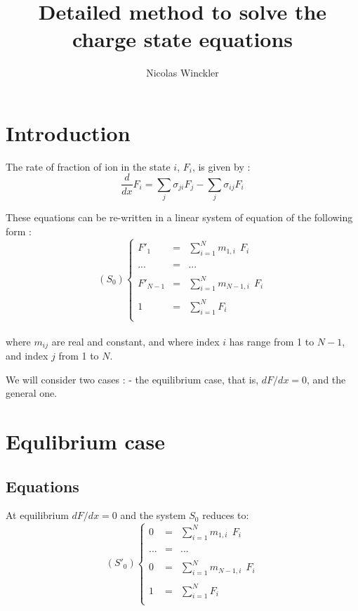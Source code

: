 \documentclass[a4paper,12pt]{article}
\title{Detailed method to solve the charge state equations}
\author{Nicolas Winckler}
\begin{document}
\maketitle


\section{Introduction}

The rate of fraction of ion in the state $i$, $F_i$, is given by :
\begin{equation}
\frac{d}{dx}F_i = \sum_j \sigma_{ji} F_j - \sum_j \sigma_{ij} F_i
\end{equation}


These equations can be re-written in a linear system of equation of the following form :
\\ 

$$(S_0)\left\lbrace
\begin{array}{lcl}
F'_1&=& \sum_{i=1}^N m_{1,i} \ \ F_i  \\
 & & \\
... &=& ...\\
 & & \\
F'_{N-1} &=& \sum_{i=1}^N m_{N-1,i} \ \ F_i \\
 & & \\
1 &=&\sum_{i=1}^N F_i\\
\end{array}\right.$$
\\
where $m_{ij}$ are real and constant, and where index $i$ has range from 1 to $N-1$, and index $j$ from 1 to $N$. 

We will consider two cases : - the equilibrium case, that is, $dF/dx=0$, and the general one.
\section{Equlibrium case} 
\subsection{Equations}
At equilibrium  $dF/dx=0$ and the system $S_0$ reduces to:
$$(S'_0)\left\lbrace
\begin{array}{lcl}
0 &=& \sum_{i=1}^N m_{1,i} \ \ F_i  \\
 & & \\
... &=& ...\\
 & & \\
0 &=& \sum_{i=1}^N m_{N-1,i} \ \ F_i \\
 & & \\
1 &=&\sum_{i=1}^N F_i\\
\end{array}\right.$$
\end{document}
